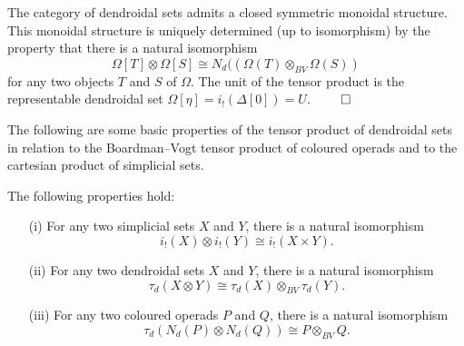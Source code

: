 \begin{thm}
The category of dendroidal sets admits a closed symmetric mo\-noi\-dal structure. This monoidal structure
is uniquely determined (up to isomorphism) by the property that there is a natural isomorphism
$$
\Omega[T]\otimes \Omega[S]\cong N_d((\Omega(T)\otimes_{BV}\Omega(S))
$$
for any two objects $T$ and $S$ of $\Omega$. The unit of the tensor product is the representable dendroidal set $\Omega[\eta]=i_!(\Delta[0])=U$. $\hfill\qed$
\label{dsetsismonoidal}
\end{thm}

The following are some basic properties of the tensor product of dendroidal sets in relation to the Boardman--Vogt tensor product of coloured operads and to the cartesian product of simplicial sets.

\begin{prop}
The following properties hold:
\begin{itemize}
\item[{\rm (i)}] For any two simplicial sets $X$ and $Y$, there is a natural isomorphism
$$
i_!(X)\otimes i_!(Y)\cong i_!(X\times Y).
$$
\item[{\rm (ii)}] For any two dendroidal sets $X$ and $Y$, there is a natural isomorphism
$$
\tau_d(X\otimes Y)\cong \tau_d(X)\otimes_{BV} \tau_d (Y).
$$
\item[{\rm (iii)}] For any two coloured operads $P$ and $Q$, there is a natural isomorphism
$$
\tau_d(N_d(P)\otimes N_d(Q))\cong P\otimes_{BV} Q.
$$
\end{itemize}
\label{proptensor}
\end{prop}
